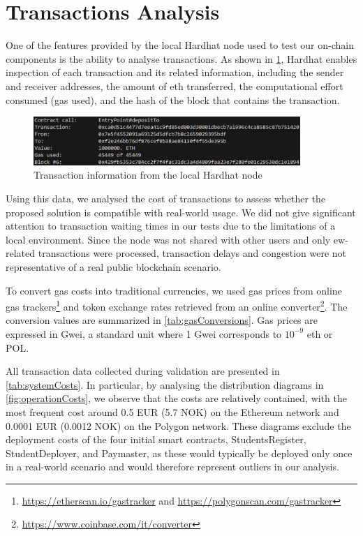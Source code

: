 \section{Transactions Analysis}
One of the features provided by the local Hardhat node used to test our on-chain components is the ability to analyse transactions. As shown in \cref{fig:exampleTransaction}, Hardhat enables inspection of each transaction and its related information, including the sender and receiver addresses, the amount of \gls{eth} transferred, the computational effort consumed (gas used), and the hash of the block that contains the transaction.
\begin{figure}
  \centering
  \includegraphics[width=0.9\textwidth]{figures/hardhatExample.png}
  \caption[Transaction information from the local Hardhat node]{Transaction information from the local Hardhat node}
  \label{fig:exampleTransaction}
\end{figure}

Using this data, we analysed the cost of transactions to assess whether the proposed solution is compatible with real-world usage. We did not give significant attention to transaction waiting times in our tests due to the limitations of a local environment. Since the node was not shared with other users and only \gls{ew}-related transactions were processed, transaction delays and congestion were not representative of a real public blockchain scenario.

To convert gas costs into traditional currencies, we used gas prices from online gas trackers\footnote{\url{https://etherscan.io/gastracker} and \url{https://polygonscan.com/gastracker}} and token exchange rates retrieved from an online converter\footnote{\url{https://www.coinbase.com/it/converter}}. The conversion values are summarized in \cref{tab:gasConversions}. Gas prices are expressed in Gwei, a standard unit where 1 Gwei corresponds to $10^{-9}$ \gls{eth} or POL.



All transaction data collected during validation are presented in \cref{tab:systemCosts}. In particular, by analysing the distribution diagrams in \cref{fig:operationCosts}, we observe that the costs are relatively contained, with the most frequent cost around 0.5 EUR (5.7 NOK) on the Ethereum network and 0.0001 EUR (0.0012 NOK) on the Polygon network. These diagrams exclude the deployment costs of the four initial smart contracts, StudentsRegister, StudentDeployer, and Paymaster, as these would typically be deployed only once in a real-world scenario and would therefore represent outliers in our analysis.


